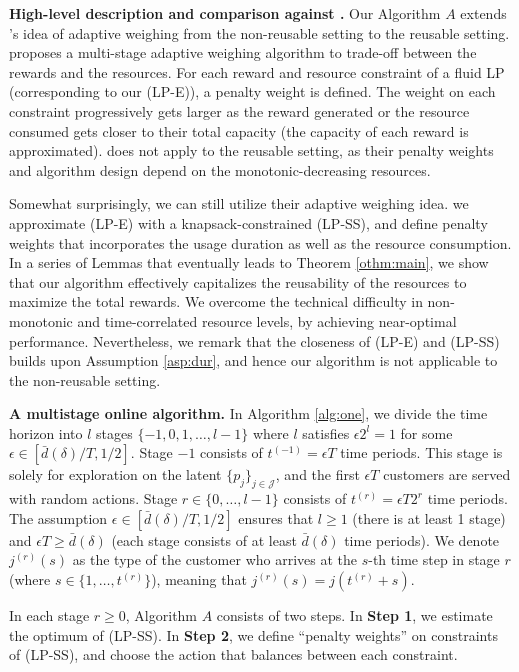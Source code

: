 \documentclass[letterpaper, 10 pt, conference]{ieeeconf}  %
\newcommand{\JJJ}{\mathcal{J}}
\theoremstyle{plain}
\theoremstyle{definition}
\theoremstyle{remark}
\begin{document}
\textbf{High-level description and comparison against \cite{devanur2019near}.} Our Algorithm $A$ extends \cite{devanur2019near}'s idea of adaptive weighing from the non-reusable setting to the reusable setting. \cite{devanur2019near} proposes a multi-stage adaptive weighing algorithm to trade-off between the rewards and the resources. For each reward and resource constraint of a fluid LP (corresponding to our (LP-E)), a penalty weight is defined. The weight on each constraint progressively gets larger as the reward generated or the resource consumed gets closer to their total capacity (the capacity of each reward is approximated). \cite{devanur2019near} does not apply to the reusable setting, as their penalty weights and algorithm design depend on the monotonic-decreasing resources.

Somewhat surprisingly, we can still utilize their adaptive weighing idea. we approximate (LP-E) with a knapsack-constrained (LP-SS), and define penalty weights that incorporates the usage duration as well as the resource consumption. In a series of Lemmas that eventually leads to Theorem \ref{othm:main}, we show that our algorithm effectively capitalizes the reusability of the resources to maximize the total rewards. We overcome the technical difficulty in non-monotonic and time-correlated resource levels, by achieving near-optimal performance. Nevertheless, we remark that the closeness of (LP-E) and (LP-SS) builds upon Assumption \ref{asp:dur}, and hence our algorithm is not applicable to the non-reusable setting.

\textbf{A multistage online algorithm.} In Algorithm \ref{alg:one}, we divide the time horizon into $l$ stages $\{-1, 0,1,\ldots,l-1\}$ where $l$ satisfies $\epsilon 2^l=1$ for some $\epsilon \in [\bar{d}(\delta)/T, 1/2]$. Stage $-1$ consists of $t^{(-1)}=\epsilon T$ time periods. This stage is solely for exploration on the latent $\{p_j\}_{j\in \JJJ}$, and the first $\epsilon T$ customers are served with random actions. Stage $r \in \{0,\ldots,l-1\}$ consists of $t^{(r)}=\epsilon T 2^r$ time periods. The assumption $\epsilon \in [\bar{d}(\delta)/T, 1/2]$ ensures that $l \geq 1$ (there is at least 1 stage) and $\epsilon T \geq \bar{d}(\delta)$ (each stage consists of at least $\bar{d}(\delta)$ time periods). We denote $j^{(r)}(s)$ as the type of the customer who arrives at the $s$-th time step in stage $r$ (where $s \in \{1,\ldots,t^{(r)}\}$), meaning that $j^{(r)}(s) = j(t^{(r)}+s)$.  

In each stage $r \geq 0$, Algorithm $A$ consists of two steps. In \textbf{Step 1}, we estimate the optimum of (LP-SS). In \textbf{Step 2}, we define ``penalty weights'' on constraints of (LP-SS), and choose the action that balances between each constraint. 
\end{document}
